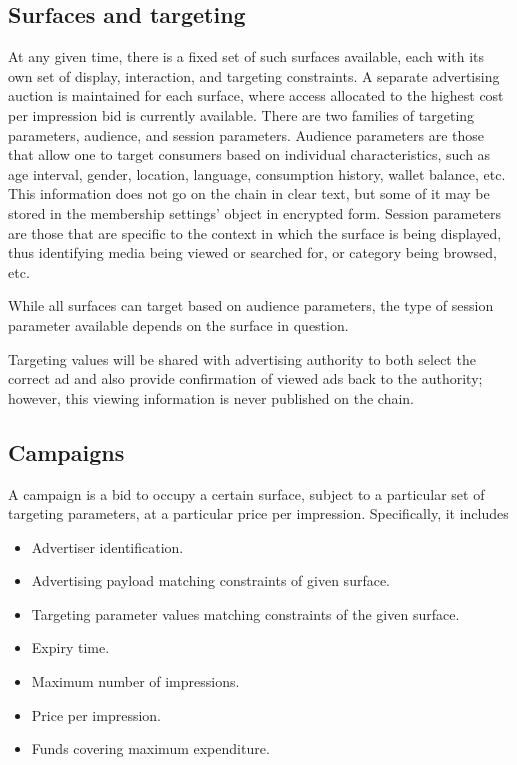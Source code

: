 \documentclass{article}
\begin{document}

\subsection{Surfaces and targeting}

At any given time, there is a fixed set of such surfaces available, each with its own set of display, interaction, and targeting constraints. A separate advertising auction is maintained for each surface, where access allocated to the highest cost per impression bid is currently available.
There are two families of targeting parameters, audience, and session parameters. Audience parameters are those that allow one to target consumers based on individual characteristics, such as age interval, gender, location, language, consumption history, wallet balance, etc. This information does not go on the chain in clear text, but some of it may be stored in the membership settings' object in encrypted form. Session parameters are those that are specific to the context in which the surface is being displayed, thus identifying media being viewed or searched for, or category being browsed, etc.

While all surfaces can target based on audience parameters, the type of session parameter available depends on the surface in question.

Targeting values will be shared with advertising authority to both select the correct ad and also provide confirmation of viewed ads back to the authority; however, this viewing information is never published on the chain.

\subsection{Campaigns}

A campaign is a bid to occupy a certain surface, subject to a particular set of targeting parameters, at a particular price per impression. Specifically, it includes

\begin{itemize}
 \item Advertiser identification.
 \item Advertising payload matching constraints of given surface. %
 \item Targeting parameter values matching constraints of the given surface.
 \item Expiry time.
 \item Maximum number of impressions.
 \item Price per impression.
 \item Funds covering maximum expenditure.
\end{itemize}
\end{document}
